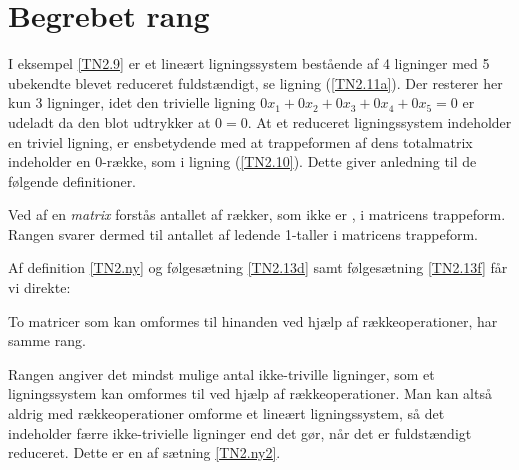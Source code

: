 \section{Begrebet rang}
I eksempel \ref{TN2.9} er et lineært ligningssystem bestående af 4 ligninger med 5 ubekendte blevet reduceret fuldstændigt, se ligning (\ref{TN2.11a}). Der resterer her kun 3 ligninger, idet den trivielle ligning $0x_1+0x_2+0x_3+0x_4+0x_5=0$ er udeladt da den blot udtrykker at $0=0$. At et reduceret ligningssystem indeholder en triviel ligning, er ensbetydende med at trappeformen af dens totalmatrix indeholder en $0$-række, som i ligning (\ref{TN2.10}). Dette giver anledning til de følgende definitioner.

\begin{definition}[Rang]\label{TN2.ny}
Ved  af en \textit{matrix} forstås antallet af rækker, som ikke er , i matricens trappeform. Rangen svarer dermed til antallet af ledende 1-taller i matricens trappeform.
\end{definition}

Af definition \ref{TN2.ny} og følgesætning \ref{TN2.13d} samt følgesætning \ref{TN2.13f} får vi direkte:

\begin{theorem}\label{TN2.ny2}
To matricer som kan omformes til hinanden ved hjælp af rækkeoperationer, har samme rang.

\end{theorem}

\begin{aha}
Rangen angiver det mindst mulige antal ikke-triville ligninger, som et ligningssystem kan omformes til ved hjælp af rækkeoperationer. Man kan altså aldrig med rækkeoperationer omforme et lineært ligningssystem, så det indeholder færre ikke-trivielle ligninger end det gør, når det er fuldstændigt reduceret. Dette er en af sætning \ref{TN2.ny2}. 
\end{aha}

